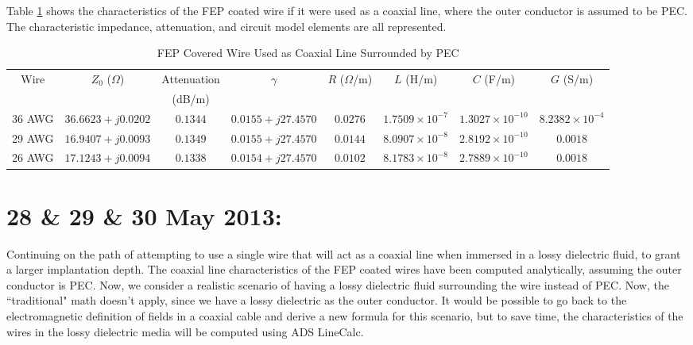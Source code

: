 \documentclass[12pt,onecolumn,titlepage]{article}
\begin{document}
Table \ref{tab:FEP_coax_PEC} shows the characteristics of the FEP coated wire if it were used as a coaxial line, where the outer conductor is assumed to be PEC. The characteristic impedance, attenuation, and circuit model elements are all represented.


\begin{table}[h!]
\scriptsize
\centering
	\caption{FEP Covered Wire Used as Coaxial Line Surrounded by PEC}
	\begin{tabular}{| c | c | c | c | c | c | c | c |}
	\hline
	 Wire & $Z_0$ ($\Omega$) & Attenuation & $\gamma$ & $R$ ($\Omega$/m) & $L$ (H/m) & $C$ (F/m) & $G$ (S/m) \\ 
	 & & (dB/m) & & & & & \\ \hline
	 36 AWG & $36.6623 + j0.0202$ & $0.1344$ & $0.0155 + j27.4570$ & $0.0276$ & $1.7509 \times 10^{-7}$ & $1.3027 \times 10^{-10}$ & $8.2382 \times 10^{-4}$ \\ \hline
	 29 AWG & $16.9407 + j0.0093$ & $0.1349$ & $0.0155 + j27.4570$ & $0.0144$ & $8.0907 \times 10^{-8}$ & $2.8192 \times 10^{-10}$ & $0.0018$ \\ \hline
	 26 AWG & $17.1243 + j0.0094$ & $0.1338$ & $0.0154 + j27.4570$ & $0.0102$ & $8.1783 \times 10^{-8}$ & $2.7889 \times 10^{-10}$ & $0.0018$ \\ \hline
	 \end{tabular}
\label{tab:FEP_coax_PEC}
\end{table}




\clearpage
\section{28 \& 29 \& 30 May 2013:}

\indent \indent Continuing on the path of attempting to use a single wire that will act as a coaxial line when immersed in a lossy dielectric fluid, to grant a larger implantation depth. The coaxial line characteristics of the FEP coated wires have been computed analytically, assuming the outer conductor is PEC. Now, we consider a realistic scenario of having a lossy dielectric fluid surrounding the wire instead of PEC. Now, the ``traditional" math doesn't apply, since we have a lossy dielectric as the outer conductor. It would be possible to go back to the electromagnetic definition of fields in a coaxial cable and derive a new formula for this scenario, but to save time, the characteristics of the wires in the lossy dielectric media will be computed using ADS LineCalc.
\end{document}
